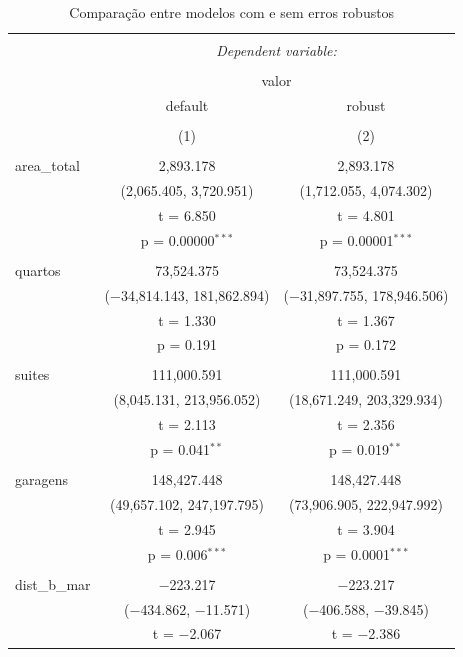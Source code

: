 \documentclass[a4paper]{article}
\begin{document}
\begin{table}[!htbp] \centering 
  \caption{Comparação entre modelos com e sem erros robustos} 
  \label{tab:tabela2} 
\begin{tabular}{@{\extracolsep{5pt}}lcc} 
\\[-1.8ex]\hline 
\hline \\[-1.8ex] 
 & \multicolumn{2}{c}{\textit{Dependent variable:}} \\ 
\cline{2-3} 
\\[-1.8ex] & \multicolumn{2}{c}{valor} \\ 
 & default & robust \\ 
\\[-1.8ex] & (1) & (2)\\ 
\hline \\[-1.8ex] 
 area\_total & 2,893.178 & 2,893.178 \\ 
  & (2,065.405, 3,720.951) & (1,712.055, 4,074.302) \\ 
  & t = 6.850 & t = 4.801 \\ 
  & p = 0.00000$^{***}$ & p = 0.00001$^{***}$ \\ 
  & & \\ 
 quartos & 73,524.375 & 73,524.375 \\ 
  & ($-$34,814.143, 181,862.894) & ($-$31,897.755, 178,946.506) \\ 
  & t = 1.330 & t = 1.367 \\ 
  & p = 0.191 & p = 0.172 \\ 
  & & \\ 
 suites & 111,000.591 & 111,000.591 \\ 
  & (8,045.131, 213,956.052) & (18,671.249, 203,329.934) \\ 
  & t = 2.113 & t = 2.356 \\ 
  & p = 0.041$^{**}$ & p = 0.019$^{**}$ \\ 
  & & \\ 
 garagens & 148,427.448 & 148,427.448 \\ 
  & (49,657.102, 247,197.795) & (73,906.905, 222,947.992) \\ 
  & t = 2.945 & t = 3.904 \\ 
  & p = 0.006$^{***}$ & p = 0.0001$^{***}$ \\ 
  & & \\ 
 dist\_b\_mar & $-$223.217 & $-$223.217 \\ 
  & ($-$434.862, $-$11.571) & ($-$406.588, $-$39.845) \\ 
  & t = $-$2.067 & t = $-$2.386 \\ 

\end{tabular}
\end{table}
\end{document}
